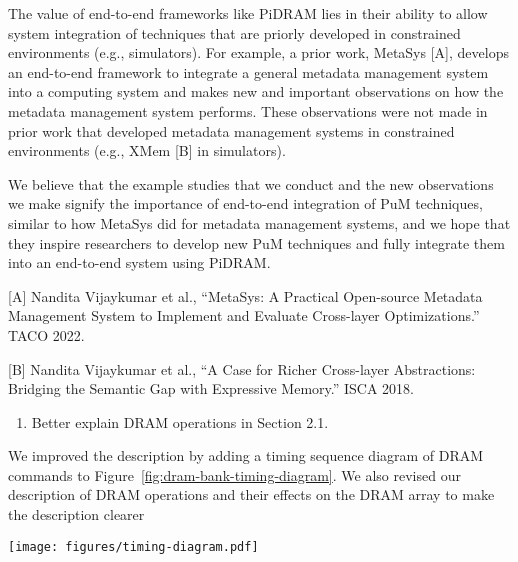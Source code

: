 The value of end-to-end frameworks like PiDRAM lies in their ability to allow system integration of techniques that are priorly developed in constrained environments (e.g., simulators). For example, a prior work, MetaSys [A], develops an end-to-end framework to integrate a general metadata management system into a computing system and makes new and important observations on how the metadata management system performs. These observations were not made in prior work that developed metadata management systems in constrained environments (e.g., XMem [B] in simulators).

We believe that the example studies that we conduct and the new observations we make signify the importance of end-to-end integration of PuM techniques, similar to how MetaSys did for metadata management systems, and we hope that they inspire researchers to develop new PuM techniques and fully integrate them into an end-to-end system using PiDRAM.

[A] Nandita Vijaykumar et al., ``MetaSys: A Practical Open-source Metadata Management System to Implement and Evaluate Cross-layer Optimizations.'' TACO 2022.

[B] Nandita Vijaykumar et al., ``A Case for Richer Cross-layer Abstractions: Bridging the Semantic Gap with Expressive Memory.'' ISCA 2018.

\newpage
\bigbreak
\begin{tcolorbox}
    \begin{enumerate}[label=R4/\arabic*]
        \addtocounter{enumi}{5}
        \item \label{q:r4q6} Better explain DRAM operations in Section 2.1.
    \end{enumerate}
\end{tcolorbox} 

We improved the description by adding a timing sequence diagram of DRAM commands to Figure~\ref{fig:dram-bank-timing-diagram}. We also revised our description of DRAM operations and their effects on the DRAM array to make the description clearer 

\vspace{5pt}
\yyboxbegin
{}
\yyboxend 


\vspace{5pt}
\yyboxbegin
\texttt{[image: figures/timing-diagram.pdf]}
\centering

